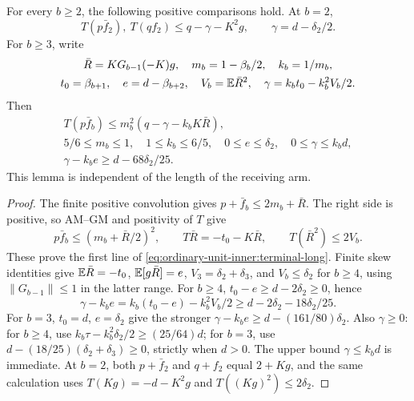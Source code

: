 \begin{lemma}
\label{lem:ordinary-unit-inner-terminal}
For every \(b\ge2\), the following positive comparisons hold.
At \(b=2\),
\begin{equation}\label{eq:ordinary-unit-inner:terminal2}
 T(p\bar f_2),\ T(qf_2)\le q-\gamma-K^2g,\qquad
 \gamma=d-\delta_2/2.
\end{equation}
For \(b\ge3\), write
\begin{equation}\label{eq:ordinary-unit-inner:terminal-data}
\begin{gathered}
 \bar R=KG_{b-1}(-K)g,\quad m_b=1-\beta_b/2,\quad k_b=1/m_b,\\
 t_0=\beta_{b+1},\quad e=d-\beta_{b+2},\quad
 V_b=\mathbb E\bar R^2,\quad \gamma=k_bt_0-k_b^2V_b/2.
\end{gathered}
\end{equation}
Then
\begin{equation}\label{eq:ordinary-unit-inner:terminal-long}
\begin{gathered}
 T(p\bar f_b)\le m_b^2(q-\gamma-k_bK\bar R),\\
 5/6\le m_b\le1,\quad1\le k_b\le6/5,\quad
 0\le e\le\delta_2,\quad0\le\gamma\le k_bd,\\
 \gamma-k_be\ge d-68\delta_2/25.
\end{gathered}
\end{equation}
This lemma is independent of the length of the receiving arm.
\end{lemma}
\begin{proof}
The finite positive convolution gives
\(p+\bar f_b\le2m_b+\bar R\). The right side is positive, so
AM--GM and positivity of \(T\) give
\[
 p\bar f_b\le(m_b+\bar R/2)^2,\qquad
 T\bar R=-t_0-K\bar R,\qquad T(\bar R^2)\le2V_b.
\]
These prove the first line of \eqref{eq:ordinary-unit-inner:terminal-long}.
Finite skew identities give \(\mathbb E\bar R=-t_0\),
\(\mathbb E[g\bar R]=e\), \(V_3=\delta_2+\delta_3\), and
\(V_b\le\delta_2\) for \(b\ge4\), using
\(\|G_{b-1}\|\le1\) in the latter range.
For \(b\ge4\),
\(t_0-e\ge d-2\delta_2\ge0\), hence
\[
 \gamma-k_be=k_b(t_0-e)-k_b^2V_b/2
       \ge d-2\delta_2-18\delta_2/25.
\]
For \(b=3\), \(t_0=d\), \(e=\delta_2\) give the stronger
\(\gamma-k_be\ge d-(161/80)\delta_2\).
Also \(\gamma\ge0\): for \(b\ge4\), use
\(k_b\tau-k_b^2\delta_2/2\ge(25/64)d\);
for \(b=3\), use \(d-(18/25)(\delta_2+\delta_3)\ge0\),
strictly when \(d>0\).
The upper bound \(\gamma\le k_bd\) is immediate.
At \(b=2\), both \(p+\bar f_2\) and \(q+f_2\) equal \(2+Kg\),
and the same calculation uses
\(T(Kg)=-d-K^2g\) and \(T((Kg)^2)\le2\delta_2\).
\end{proof}

